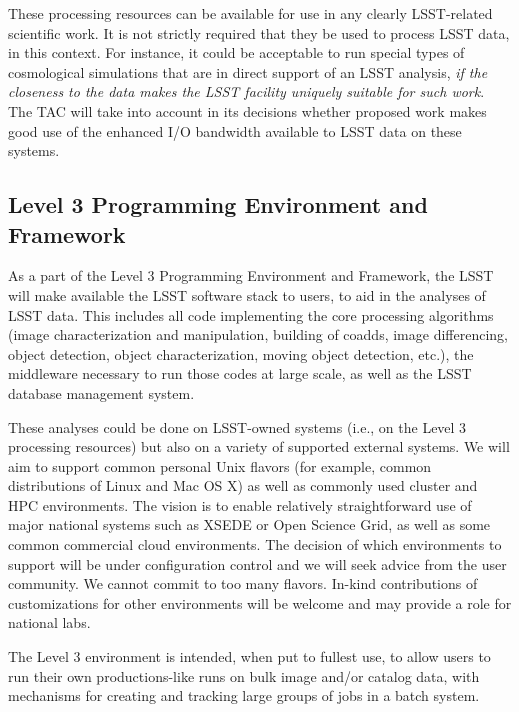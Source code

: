 \documentclass[12pt]{article}
\begin{document}
These processing resources can be available for use in any clearly LSST-related scientific work.  It is not strictly required that they be used to process LSST data, in this context.  For instance, it could be acceptable to run special types of cosmological simulations that are in direct support of an LSST analysis, {\em if the closeness to the data makes the LSST facility uniquely suitable for such work}. The TAC will take into account in its decisions whether proposed work makes good use of the enhanced I/O bandwidth available to LSST data on these systems.

\subsection{Level 3 Programming Environment and Framework}
\label{sec:l3framework}

As a part of the Level 3 Programming Environment and Framework, the LSST will make available the LSST software stack to users, to aid in the analyses of LSST data. This includes all code implementing the core processing algorithms (image characterization and manipulation, building of coadds, image differencing, object detection, object characterization, moving object detection, etc.), the middleware necessary to run those codes at large scale, as well as the LSST database management system.

These analyses could be done on LSST-owned systems (i.e., on the Level 3 processing resources) but also on a variety of supported external systems.  We will aim to support common personal Unix flavors (for example, common distributions of Linux and Mac OS X) as well as commonly used cluster and HPC environments.  The vision is to enable relatively straightforward use of major national systems such as XSEDE or Open Science Grid, as well as some common commercial cloud environments.  The decision of which environments to support will be under configuration control and we will seek advice from the user community.  We cannot commit to too many flavors.  In-kind contributions of customizations for other environments will be welcome and may provide a role for national labs.

The Level 3 environment is intended, when put to fullest use, to allow users to run their own productions-like runs on bulk image and/or catalog data, with mechanisms for creating and tracking large groups of jobs in a batch system.
\end{document}
